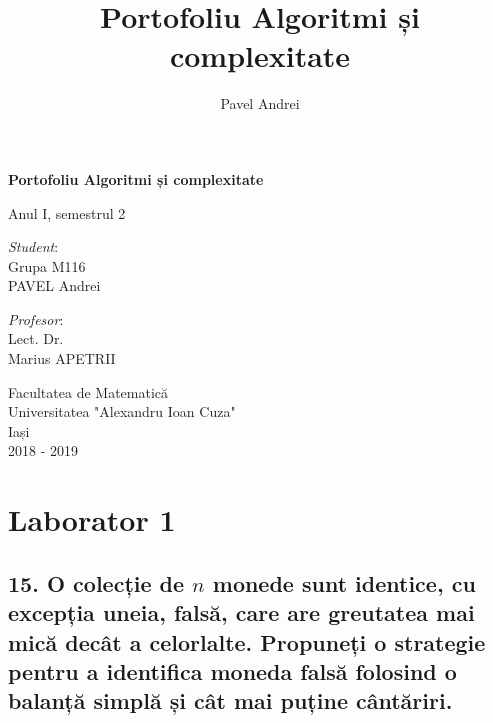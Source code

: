 \documentclass[11pt]{article}
\author{Pavel Andrei}
\date{}
\title{Portofoliu Algoritmi și complexitate}
\begin{document}
\begin{titlepage}
    \begin{center}
        \vspace*{7cm}
 
 
        \Huge
        \textbf{Portofoliu Algoritmi și complexitate}

        \vspace{0.5cm}
        \LARGE
        Anul I, semestrul 2

        \vspace{3cm}
    \end{center}
%
\begin{minipage}[t]{0.7\textwidth}
    \raggedright
    \onehalfspacing
    \large
    \textit{Student}:\\[.5\baselineskip]
    Grupa M116\\
    PAVEL Andrei
\end{minipage}
\begin{minipage}[t]{0.3\textwidth}
    \onehalfspacing
    \large
    \textit{Profesor}:\\[.5\baselineskip]
    Lect. Dr. \\
    Marius APETRII

\end{minipage}%

    \begin{center}
        \vfill
 
        \vspace{0.8cm}
 
 
        \Large
        Facultatea de Matematică\\
        Universitatea "Alexandru Ioan Cuza"\\
        Iași\\
        2018 - 2019
 
    \end{center}
\end{titlepage}

\section*{Laborator 1}
\label{sec:org21d4d07}
\subsection*{15. O colecție de \(n\) monede sunt identice, cu excepția uneia, falsă, care are greutatea mai mică decât a celorlalte. Propuneți o strategie pentru a identifica moneda falsă folosind o balanță simplă și cât mai puține cântăriri.}
\label{sec:org7cfcab3}
\end{document}
